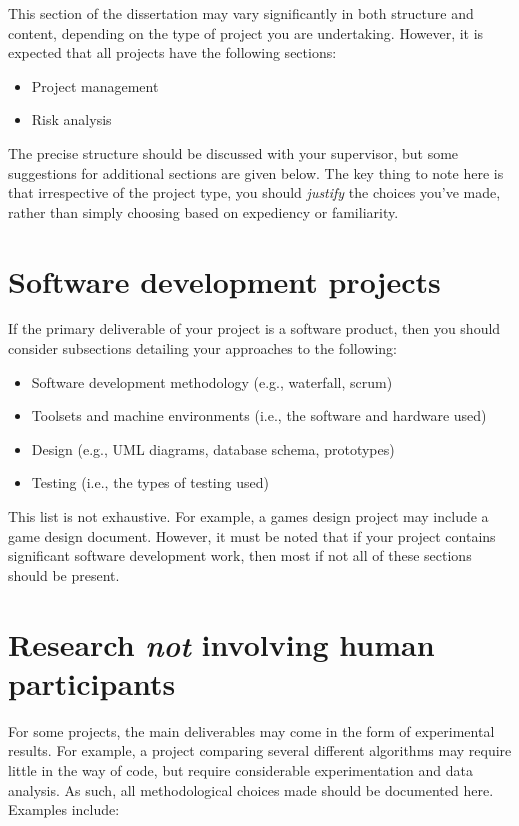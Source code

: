 This section of the dissertation may vary significantly in both structure and content, depending on the type of project you are undertaking. However, it is expected that all projects have the following sections:

\begin{itemize}
    \item Project management
    \item Risk analysis
\end{itemize}

The precise structure should be discussed with your supervisor, but some suggestions for additional sections are given below. The key thing to note here is that irrespective of the project type, you should \emph{justify} the choices you've made, rather than simply choosing based on expediency or familiarity.

\section{Software development projects}
\label{sd-projects}

If the primary deliverable of your project is a software product, then you should consider subsections detailing your approaches to the following:

\begin{itemize}
    \item Software development methodology (e.g., waterfall, scrum)
    \item Toolsets and machine environments (i.e., the software and hardware used)
    \item Design (e.g., UML diagrams, database schema, prototypes)
    \item Testing (i.e., the types of testing used)
\end{itemize}

This list is not exhaustive. For example, a games design project may include a game design document. However, it must be noted that if your project contains significant software development work, then most if not all of these sections should be present.

\section{Research \emph{not} involving human participants}

For some projects, the main deliverables may come in the form of experimental results. For example, a project comparing several different algorithms may require little in the way of code, but require considerable experimentation and data analysis. As such, all methodological choices made should be documented here. Examples include:

